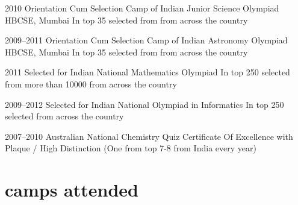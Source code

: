\documentclass[11pt]{friggeri-cv}%
\begin{document}
\begin{entrylist}
  \entryy
    {2010}
    {Orientation Cum Selection Camp of Indian Junior Science Olympiad}
    {HBCSE, Mumbai}
    {In top 35  selected from  from across the country}
\end{entrylist}
\begin{entrylist}
  \entryy
    {2009--2011}
    {Orientation Cum Selection Camp of Indian Astronomy Olympiad}
    {HBCSE, Mumbai}
    {In top 35 selected from  from across the country}
\end{entrylist}
\begin{entrylist}
  \entryy
    {2011}
    {Selected for Indian National Mathematics Olympiad}{}
    {In top 250 selected from more than 10000 from across the country}
\end{entrylist}
\begin{entrylist}
  \entryy
    {2009--2012}
    {Selected for Indian National Olympiad in Informatics}
    {}
    {In top 250  selected from across the country}
\end{entrylist}
\begin{entrylist}
  \entryy
    {2007--2010}
    {Australian National Chemistry Quiz}
    {}
    {Certificate Of Excellence with Plaque / High Distinction (One from top 7-8 from India every year)}
\end{entrylist}




\section{camps attended}
\end{document}
